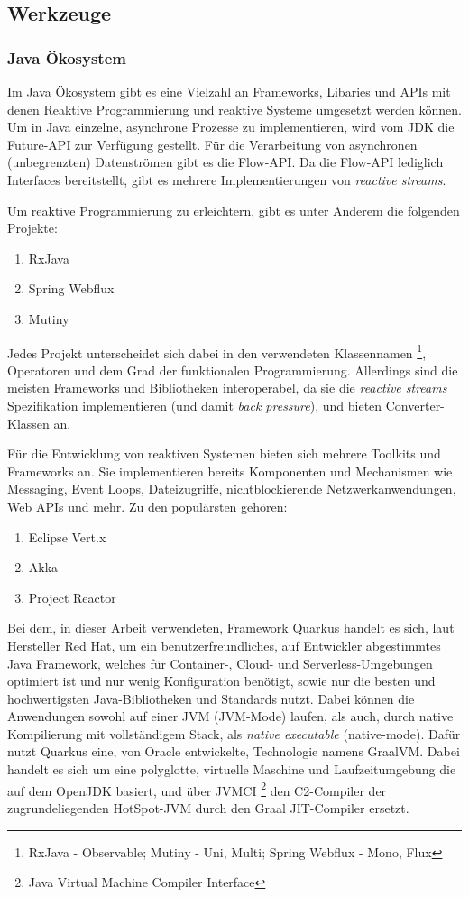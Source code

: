 \subsection{Werkzeuge}
\subsubsection{Java Ökosystem}
Im Java Ökosystem gibt es eine Vielzahl an Frameworks, Libaries und APIs mit denen Reaktive Programmierung und reaktive Systeme umgesetzt
werden können.
Um in Java einzelne, asynchrone Prozesse zu implementieren, wird vom JDK die Future-API zur Verfügung gestellt.\parencite{OracleFuture}
Für die Verarbeitung von asynchronen (unbegrenzten) Datenströmen gibt es die Flow-API.\parencite{OracleFlow}
Da die Flow-API lediglich Interfaces bereitstellt, gibt es mehrere Implementierungen von \textit{reactive streams}.

Um reaktive Programmierung zu erleichtern, gibt es unter Anderem die folgenden Projekte:
\begin{enumerate}
    \item RxJava
    \item Spring Webflux
    \item Mutiny
\end{enumerate}
Jedes Projekt unterscheidet sich dabei in den verwendeten Klassennamen \footnote{RxJava - Observable; Mutiny - Uni, Multi; Spring Webflux - Mono, Flux},
Operatoren und dem Grad der funktionalen Programmierung.\parencite{ReactiveX, Mutiny}
Allerdings sind die meisten Frameworks und Bibliotheken interoperabel, da sie die \textit{reactive streams} Spezifikation implementieren (und damit
\textit{back pressure}), und bieten Converter-Klassen an.

Für die Entwicklung von reaktiven Systemen bieten sich mehrere Toolkits und Frameworks an.
Sie implementieren bereits Komponenten und Mechanismen wie Messaging, Event Loops, Dateizugriffe, nichtblockierende Netzwerkanwendungen, Web APIs und mehr.
Zu den populärsten gehören:
\begin{enumerate}
    \item Eclipse Vert.x
    \item Akka
    \item Project Reactor
\end{enumerate}\parencite{Vert.x, Akka, ProjectReactor}

Bei dem, in dieser Arbeit verwendeten, Framework Quarkus handelt es sich, laut Hersteller Red Hat, um ein
benutzerfreundliches, auf Entwickler abgestimmtes Java Framework, welches für Container-, Cloud- und Serverless-Umgebungen optimiert ist und nur wenig
Konfiguration benötigt, sowie nur die besten und hochwertigsten Java-Bibliotheken und Standards nutzt.
Dabei können die Anwendungen sowohl auf einer JVM (JVM-Mode) laufen, als auch, durch native Kompilierung mit vollständigem Stack,
als \textit{native executable} (native-mode). Dafür nutzt Quarkus eine, von Oracle entwickelte, Technologie namens GraalVM. Dabei handelt es sich um
eine polyglotte, virtuelle Maschine und Laufzeitumgebung die auf dem OpenJDK basiert, und über JVMCI \footnote{Java Virtual Machine Compiler Interface} den
C2-Compiler der zugrundeliegenden HotSpot-JVM durch den Graal JIT-Compiler ersetzt.\parencite{GraalVM}


